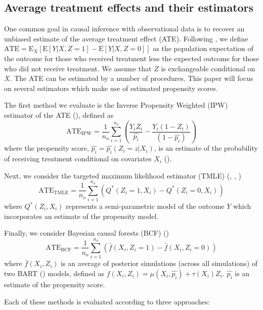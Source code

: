 \documentclass[aos]{imsart}
\newcommand{\E}{\mbox{E}}
\begin{document}
\subsection{Average treatment effects and their estimators}

One common goal in causal inference with observational data is to recover an unbiased estimate of the average treatment effect (ATE). Following \cite{rosenbaum1983central}, 
we define $\textrm{ATE} = \E_X[\E[Y | X, Z = 1] - \E[Y | X, Z = 0]]$ as the population expectation of the outcome for those who received treatment less the expected outcome for those who did 
not receive treatment. We assume that $Z$ is exchangeable conditional on $X$. The ATE can be estimated by a number of procedures. This paper will focus on several 
estimators which make use of estimated propensity scores.

The first method we evaluate is the Inverse Propensity Weighted (IPW) estimator of the ATE (\cite{hirano2003efficient}), defined as
\[ \textrm{ATE}_{\textrm{IPW}} = \frac{1}{n_o} \sum_{i = 1}^{n_o} \left( \frac{Y_i Z_i}{\hat{p_i}} - \frac{Y_i (1 - Z_i)}{(1 - \hat{p_i})} \right) \]
where the propensity score, $\hat{p_i} = \hat{p_i}(Z_i = z | X_i)$, is an estimate of the probability of receiving treatment conditional on covariates $X_i$ (\cite{rosenbaum1983central}).

Next, we consider the targeted maximum likelihood estimator (TMLE) (\cite{van2010targeted}, \cite{van2010targeted2}, \cite{gruber2009targeted})
\[\textrm{ATE}_{\textrm{TMLE}} = \frac{1}{n_o} \sum_{i = 1}^{n_o} \left( Q^*\left( Z_i = 1, X_i \right) - Q^*\left( Z_i = 0, X_i \right) \right)\]
where $Q^*\left( Z_i, X_i \right)$ represents a semi-parametric model of the outcome $Y$ which incorporates an estimate of the propensity model.

Finally, we consider Bayesian causal forests (BCF) (\cite{hahn2020bayesian})
\[\textrm{ATE}_{\textrm{BCF}} = \frac{1}{n_o} \sum_{i = 1}^{n_o} \left( \bar{f}(X_i, Z_i = 1) - \bar{f}(X_i, Z_i = 0) \right) \]
where $\bar{f}(X_i, Z_i)$ is an average of posterior simulations (across all simulations) of two BART (\cite{chipman2010bart}) models, defined as $f(X_i, Z_i) = \mu(X_i, \hat{p_i}) + \tau(X_i) Z_i$. $\hat{p_i}$ is an estimate of the propensity score.

Each of these methods is evaluated according to three approaches:
\end{document}
